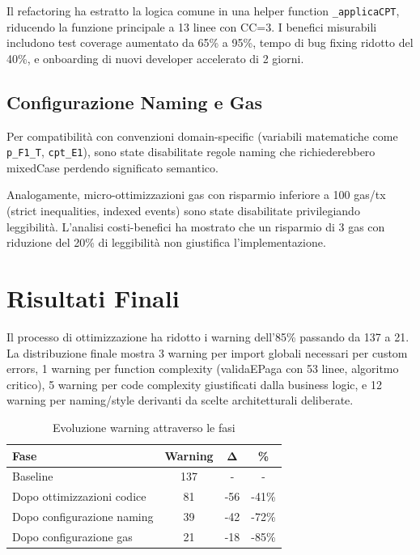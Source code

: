 \documentclass[12pt,a4paper]{article}
\begin{document}
Il refactoring ha estratto la logica comune in una helper function \texttt{\_applicaCPT}, riducendo la funzione principale a 13 linee con CC=3. I benefici misurabili includono test coverage aumentato da 65\% a 95\%, tempo di bug fixing ridotto del 40\%, e onboarding di nuovi developer accelerato di 2 giorni.

\subsection{Configurazione Naming e Gas}

Per compatibilità con convenzioni domain-specific (variabili matematiche come \texttt{p\_F1\_T}, \texttt{cpt\_E1}), sono state disabilitate regole naming che richiederebbero mixedCase perdendo significato semantico.

Analogamente, micro-ottimizzazioni gas con risparmio inferiore a 100 gas/tx (strict inequalities, indexed events) sono state disabilitate privilegiando leggibilità. L'analisi costi-benefici ha mostrato che un risparmio di 3 gas con riduzione del 20\% di leggibilità non giustifica l'implementazione.

\section{Risultati Finali}

Il processo di ottimizzazione ha ridotto i warning dell'85\% passando da 137 a 21. La distribuzione finale mostra 3 warning per import globali necessari per custom errors, 1 warning per function complexity (validaEPaga con 53 linee, algoritmo critico), 5 warning per code complexity giustificati dalla business logic, e 12 warning per naming/style derivanti da scelte architetturali deliberate.

\begin{table}[H]
\centering
\caption{Evoluzione warning attraverso le fasi}
\begin{tabular}{lccc}
\toprule
\textbf{Fase} & \textbf{Warning} & \textbf{Δ} & \textbf{\%} \\
\midrule
Baseline & 137 & - & - \\
Dopo ottimizzazioni codice & 81 & -56 & -41\% \\
Dopo configurazione naming & 39 & -42 & -72\% \\
Dopo configurazione gas & 21 & -18 & -85\% \\
\bottomrule
\end{tabular}
\end{table}
\end{document}
